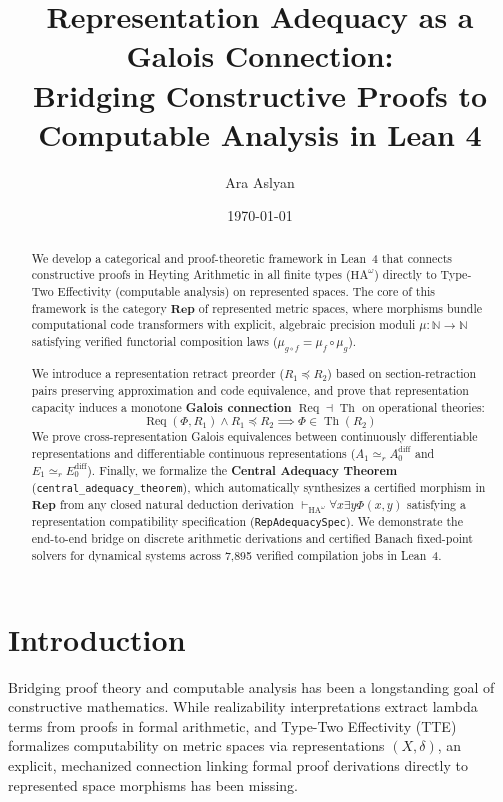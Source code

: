 \documentclass[11pt,a4paper]{article}
\title{\textbf{Representation Adequacy as a Galois Connection:\\Bridging Constructive Proofs to Computable Analysis in Lean 4}}
\author{Ara Aslyan}
\date{\today}
\theoremstyle{definition}
\theoremstyle{remark}
\newcommand{\HAomega}{\ensuremath{\mathrm{HA}^\omega}}
\newcommand{\Rep}{\ensuremath{\mathbf{Rep}}}
\newcommand{\N}{\ensuremath{\mathbb{N}}}
\newcommand{\Th}{\ensuremath{\operatorname{Th}}}
\newcommand{\Req}{\ensuremath{\operatorname{Req}}}
\newcommand{\preceqR}{\ensuremath{\preceq}}
\newcommand{\simeqR}{\ensuremath{\simeq_r}}
\begin{document}
\maketitle

\begin{abstract}
We develop a categorical and proof-theoretic framework in Lean~4 that connects constructive proofs in Heyting Arithmetic in all finite types ($\HAomega$) directly to Type-Two Effectivity (computable analysis) on represented spaces. The core of this framework is the category $\Rep$ of represented metric spaces, where morphisms bundle computational code transformers with explicit, algebraic precision moduli $\mu : \N \to \N$ satisfying verified functorial composition laws ($\mu_{g \circ f} = \mu_f \circ \mu_g$).

We introduce a representation retract preorder ($R_1 \preceqR R_2$) based on section-retraction pairs preserving approximation and code equivalence, and prove that representation capacity induces a monotone \textbf{Galois connection} $\Req \dashv \Th$ on operational theories:
\[
\Req(\Phi, R_1) \land R_1 \preceqR R_2 \implies \Phi \in \Th(R_2)
\]
We prove cross-representation Galois equivalences between continuously differentiable representations and differentiable continuous representations ($A_1 \simeqR A_0^{\text{diff}}$ and $E_1 \simeqR E_0^{\text{diff}}$). Finally, we formalize the \textbf{Central Adequacy Theorem} (\texttt{central\_adequacy\_theorem}), which automatically synthesizes a certified morphism in $\Rep$ from any closed natural deduction derivation $\vdash_{\HAomega} \forall x \exists y \Phi(x, y)$ satisfying a representation compatibility specification (\texttt{RepAdequacySpec}). We demonstrate the end-to-end bridge on discrete arithmetic derivations and certified Banach fixed-point solvers for dynamical systems across 7,895 verified compilation jobs in Lean~4.
\end{abstract}

\section{Introduction}

Bridging proof theory and computable analysis has been a longstanding goal of constructive mathematics. While realizability interpretations extract lambda terms from proofs in formal arithmetic, and Type-Two Effectivity (TTE)~\cite{weihrauch2000} formalizes computability on metric spaces via representations $(X, \delta)$, an explicit, mechanized connection linking formal proof derivations directly to represented space morphisms has been missing.
\end{document}
